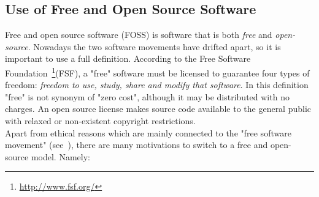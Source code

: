 \documentclass[11pt]{article} %
\begin{document}
\subsection{Use of Free and Open Source Software}\label{foss}
Free and open source software (FOSS) is software that is both \emph{free} and \emph{open-source}. Nowadays the two software movements have drifted apart, so it is important to use a full definition. According to the Free Software Foundation~\footnote{\url{http://www.fsf.org/}}(FSF), a "free" software must be licensed to guarantee four types of freedom: \emph{freedom to use, study, share and modify that software}. In this definition "free" is not synonym of "zero cost", although it may be distributed with no charges. An open source license makes source code available to the general public with relaxed or non-existent copyright restrictions.\\
Apart from ethical reasons which are mainly connected to the "free software movement" (see~\cite{free}), there are many motivations to switch to a free and open-source model. Namely:%
\end{document}
